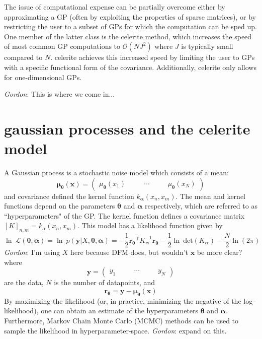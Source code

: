 \documentclass[modern]{aastex62}
\newcommand{\todo}[3]{{\color{#2}\emph{#1}: #3}}
\newcommand{\gordontodo}[1]{\todo{Gordon}{red}{#1}}
\newcommand{\project}[1]{\textsf{#1}}
\newcommand{\celerite}{\project{celerite }}
\newcommand{\bvec}[1]{{\ensuremath{\boldsymbol{#1}}}}
\newcommand{\T}{\ensuremath{\mathrm{T}}}
\newcommand{\expandvec}[2]{\left(\begin{array}{ccccc} #1\quad && \cdots\quad && #2 \end{array}\right)}
\begin{document}
	The issue of computational expense can be partially overcome either by approximating a GP (often by exploiting the properties of sparse 
	matrices), or by restricting the user to a subset of GPs for which the computation can be sped up. One member of the latter class is the 
	\celerite method, which increases the speed of most common GP computations to $\mathcal{O}(NJ^2)$ where $J$ is typically small compared 
	to $N$. \celerite achieves this increased speed by limiting the user to GPs with a specific functional form of the covariance. Additionally, \celerite 
	only allows for one-dimensional GPs. 
		
	\gordontodo{This is where we come in...}
		
\section{gaussian processes and the celerite model}
	A Gaussian process is a stochastic noise model which consists of a mean:
	\begin{equation} 
		\bvec{\mu_\theta}(\bvec{x}) = \expandvec{\mu_\bvec{\theta}(x_1)}{\mu_\bvec{\theta}(x_N)}
	\end{equation}
	and covariance defined the kernel function $k_\bvec{\alpha}(x_n, x_m)$. The mean and kernel functions depend on the parameters 
	$\bvec{\theta}$ and $\bvec{\alpha}$ respectively, which are referred to as ``hyperparameters" of the GP. The kernel function defines a covariance matrix 
	$\left[K\right]_{n, m} = k_\alpha(x_n, x_m)$. This model has a likelihood function given by
	\begin{equation}
		\ln\ \mathcal{L(\bvec{\theta}, \bvec{\alpha})} = \ln\ p(\bvec{y}|X, \bvec{\theta}, \bvec{\alpha}) = 
			-\frac{1}{2}\bvec{r_\theta}^\T K_\bvec{\alpha}^{-1}\bvec{r_\theta} 
			-\frac{1}{2}\ln\ \mathrm{det}(K_\bvec{\alpha}) - \frac{N}{2}\ln(2\pi)
	\end{equation}
	\gordontodo{I'm using $X$ here because DFM does, but wouldn't $\bvec{x}$ be more clear?}
	where 
	\begin{equation}
		\bvec{y} = \expandvec{y_1}{y_N}
	\end{equation}
	are the data, $N$ is the number of datapoints, and
	\begin{equation}
		\bvec{r_\theta} = \bvec{y}-\bvec{\mu_\theta}(\bvec{x})
	\end{equation}
	By maximizing the likelihood (or, in practice, minimizing the negative of the log-likelihood), one can obtain an estimate of the hyperparameters $\bvec{\theta}$ and 
	$\bvec{\alpha}$. Furthermore, Markov Chain Monte Carlo (MCMC) methods can be used to sample the likelihood in hyperparameter-space. \gordontodo{expand 
	on this.}
\end{document}
